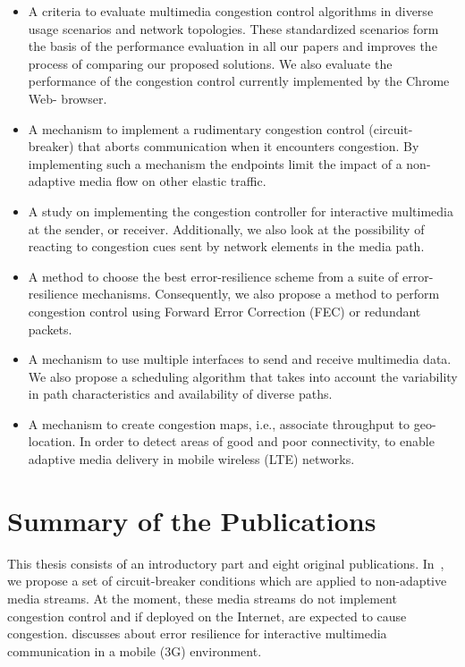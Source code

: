 \begin{itemize}
\setlength{\itemsep}{0pt}

\item A criteria to evaluate multimedia congestion control algorithms in
diverse usage scenarios and network topologies. These standardized scenarios
form the basis of the performance evaluation in all our papers and improves
the process of comparing our proposed solutions. We also evaluate the
performance of the congestion control currently implemented by the Chrome Web-
browser.

\item A mechanism to implement a rudimentary congestion control (circuit-
breaker) that aborts communication when it encounters congestion. By
implementing such a mechanism the endpoints limit the impact of a non-adaptive
media flow on other elastic traffic.

\item A study on implementing the congestion controller for interactive
multimedia at the sender, or receiver.  Additionally, we also look at the
possibility of reacting to congestion cues sent by network elements in the
media path.

\item A method to choose the best error-resilience scheme from a suite of
error-resilience mechanisms. Consequently, we also propose a method to perform
congestion control using Forward Error Correction (FEC) or redundant packets.

\item A mechanism to use multiple interfaces to send and receive multimedia
data. We also propose a scheduling algorithm that takes into account the
variability in path characteristics and availability of diverse paths. 

\item A mechanism to create congestion maps, i.e., associate throughput to 
geo-location. In order to detect areas of good and poor connectivity, to 
enable adaptive media delivery in mobile wireless (LTE) networks.
\end{itemize}

\section{Summary of the Publications}

This thesis consists of an introductory part and eight original publications.
In~, we propose a set of circuit-breaker conditions which are
applied to non-adaptive media streams. At the moment, these media streams do
not implement congestion control and if deployed on the Internet, are expected
to cause congestion.  discusses about error resilience for
interactive multimedia communication in a mobile (3G) environment.

